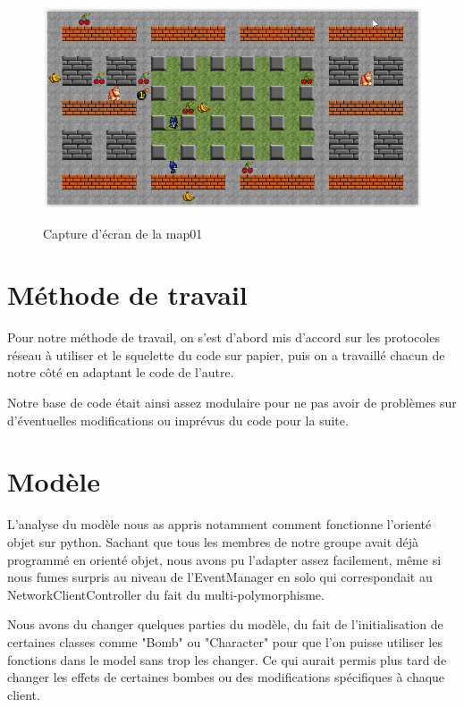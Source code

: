 \documentclass[a4paper]{article}
\begin{document}
\begin{figure}[!htbp]
	\centering
	\includegraphics[width=\textwidth]{IMG_Latex/map01.png}\\
	\caption{Capture d'écran de la map01}
	\label{shema/cp/map01}
\end{figure}

	\section{Méthode de travail}

	Pour notre méthode de travail, on s'est d'abord mis d'accord sur les protocoles réseau à utiliser et le squelette du code sur papier, puis on a travaillé chacun de notre côté en adaptant le code de l'autre.

	Notre base de code était ainsi assez modulaire pour ne pas avoir de problèmes sur d'éventuelles modifications ou imprévus du code pour la suite.

	\section{Modèle}

	L'analyse du modèle nous as appris notamment comment fonctionne l'orienté objet sur python. Sachant que tous les membres de notre groupe avait déjà programmé en orienté objet, nous avons pu l'adapter assez facilement, même si nous fumes surpris au niveau de l'EventManager en solo qui correspondait au NetworkClientController du fait du multi-polymorphisme.

	Nous avons du changer quelques parties du modèle, du fait de l'initialisation de certaines classes comme "Bomb" ou "Character" pour que l'on puisse utiliser les fonctions dans le model sans trop les changer. Ce qui aurait permis plus tard de changer les effets de certaines bombes ou des modifications spécifiques à chaque client.
	
\end{document}
